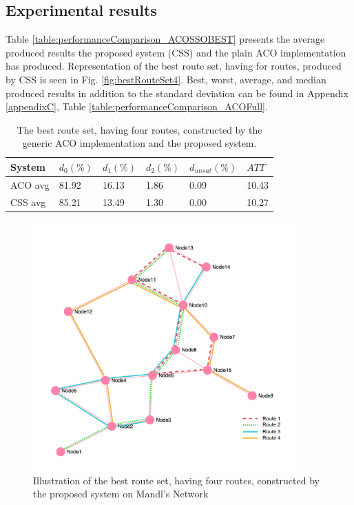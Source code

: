 \subsection{Experimental results}
\label{subsec:performanceComparison_results}


Table \vref{table:performanceComparison_ACOSSOBEST} presents the average produced results the proposed system (CSS) and the plain ACO implementation has produced. Representation of the best route set, having for routes, produced by CSS is seen in Fig. \vref{fig:bestRouteSet4}. Best, worst, average, and median produced results in addition to the standard deviation can be found in Appendix \ref{appendixC}, Table \vref{table:performanceComparison_ACOFull}.

    \begin{table}[H]
    \centering
    \begin{tabular}{|l||l|l|l|l|l|}
    \hline
    \textbf{System} & \textbf{$d_0(\%)$} & \textbf{$d_1(\%)$} & \textbf{$d_2(\%)$} & \textbf{$d_{unsat}(\%)$} & \textbf{$ATT$} \\
    \hline
    ACO avg & 81.92 & 16.13 & 1.86 & 0.09 & 10.43\\
    \hline
    CSS avg & 85.21 & 13.49 & 1.30 & 0.00 & 10.27\\
    \hline
    \end{tabular}
    \caption {The best route set, having four routes, constructed by the generic ACO implementation and the proposed system.}
    \label{table:performanceComparison_ACOSSOBEST}
    \end{table}

   

\begin{figure}[H]
    \begin{center}
    \includegraphics[width=4in]{assets/mandlnetwork_4routes.png}
    \end{center}
    \caption{Illustration of the best route set, having four routes, constructed by the proposed system on Mandl's Network}
    \label{fig:bestRouteSet4} 
\end{figure}

